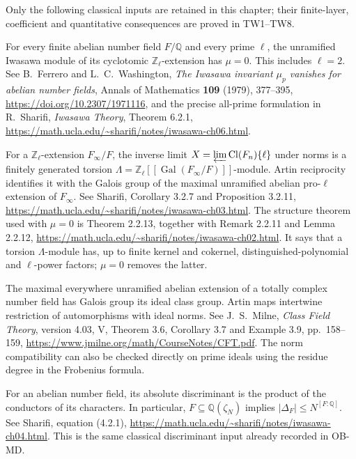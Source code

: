 Only the following classical inputs are retained in this chapter;
their finite-layer, coefficient and quantitative consequences are
proved in TW1--TW8.

\begin{description}[style=nextline,leftmargin=0pt,labelwidth=0pt,labelsep=0pt]
\item[TW-FW: Ferrero--Washington.]
For every finite abelian number field $F/\mathbb Q$ and every prime
$\ell$, the unramified Iwasawa module of its cyclotomic
$\mathbb Z_\ell$-extension has $\mu=0$.
This includes $\ell=2$.
See B.~Ferrero and L.~C.~Washington,
\emph{The Iwasawa invariant $\mu_p$ vanishes for abelian number fields},
Annals of Mathematics \textbf{109} (1979), 377--395,
\url{https://doi.org/10.2307/1971116},
and the precise all-prime formulation in R.~Sharifi,
\emph{Iwasawa Theory}, Theorem 6.2.1,
\url{https://math.ucla.edu/~sharifi/notes/iwasawa-ch06.html}.

\item[TW-IW: the ordinary Iwasawa module theorem.]
For a $\mathbb Z_\ell$-extension $F_\infty/F$, the inverse limit
$X=\varprojlim\operatorname{Cl}(F_n)\{\ell\}$ under norms is a
finitely generated torsion
$\Lambda=\mathbb Z_\ell[[\operatorname{Gal}(F_\infty/F)]]$-module.
Artin reciprocity identifies it with the Galois group of the maximal
unramified abelian pro-$\ell$ extension of $F_\infty$.
See Sharifi, Corollary 3.2.7 and Proposition 3.2.11,
\url{https://math.ucla.edu/~sharifi/notes/iwasawa-ch03.html}.
The structure theorem used with $\mu=0$ is Theorem 2.2.13,
together with Remark 2.2.11 and Lemma 2.2.12,
\url{https://math.ucla.edu/~sharifi/notes/iwasawa-ch02.html}.
It says that a torsion $\Lambda$-module has, up to finite kernel and
cokernel, distinguished-polynomial and $\ell$-power factors;
$\mu=0$ removes the latter.

\item[TW-CF: finite class-field reciprocity.]
The maximal everywhere unramified abelian extension of a totally
complex number field has Galois group its ideal class group.
Artin maps intertwine restriction of automorphisms with ideal norms.
See J.~S.~Milne, \emph{Class Field Theory}, version 4.03,
V, Theorem 3.6, Corollary 3.7 and Example 3.9, pp.~158--159,
\url{https://www.jmilne.org/math/CourseNotes/CFT.pdf}.
The norm compatibility can also be checked directly on prime ideals
using the residue degree in the Frobenius formula.

\item[TW-CD: abelian conductor--discriminant formula.]
For an abelian number field, its absolute discriminant is the product
of the conductors of its characters.  In particular,
$F\subseteq\mathbb Q(\zeta_N)$ implies
$|\Delta_F|\le N^{[F:\mathbb Q]}$.
See Sharifi, equation (4.2.1),
\url{https://math.ucla.edu/~sharifi/notes/iwasawa-ch04.html}.
This is the same classical discriminant input already recorded in
OB-MD.
\end{description}

